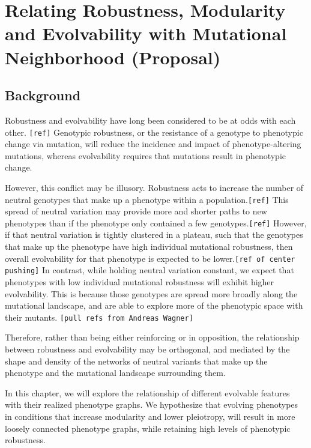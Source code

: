 \section{Relating Robustness, Modularity and Evolvability with  Mutational Neighborhood (Proposal)}

\subsection{Background}

Robustness and evolvability have long been considered to be at odds with each other. \verb|[ref]| Genotypic robustness, or the resistance of a genotype to phenotypic change via mutation, will reduce the incidence and impact of phenotype-altering mutations, whereas evolvability requires that mutations result in phenotypic change.

However, this conflict may be illusory. Robustness acts to increase the number of neutral genotypes that make up a phenotype within a population.\verb|[ref]| This spread of neutral variation may provide more and shorter paths to new phenotypes than if the phenotype only contained a few genotypes.\verb|[ref]| However, if that neutral variation is tightly clustered in a plateau, such that the genotypes that make up the phenotype have high individual mutational robustness, then overall evolvability for that phenotype is expected to be lower.\verb|[ref of center pushing]| In contrast, while holding neutral variation constant, we expect that phenotypes with low individual mutational robustness will exhibit higher evolvability. This is because those genotypes are spread more broadly along the mutational landscape, and are able to explore more of the phenotypic space with their mutants. \verb|[pull refs from Andreas Wagner]|

Therefore, rather than being either reinforcing or in opposition, the relationship between robustness and evolvability may be orthogonal, and mediated by the shape and density of the networks of neutral variants that make up the phenotype and the mutational landscape surrounding them. 

In this chapter, we will explore the relationship of different evolvable features with their realized phenotype graphs. We hypothesize that evolving phenotypes in conditions that increase modularity and lower pleiotropy, will result in more loosely connected phenotype graphs, while retaining high levels of phenotypic robustness.
